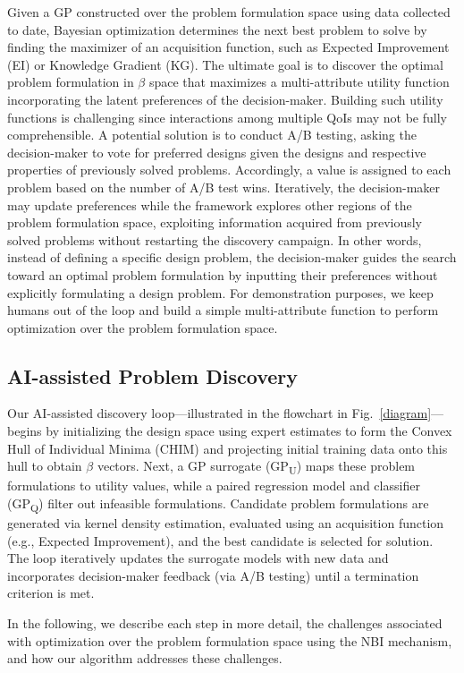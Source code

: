 \documentclass[final,5p,times,twocolumn]{elsarticle}
\begin{document}
Given a GP constructed over the problem formulation space using data collected to date, Bayesian optimization determines the next best problem to solve by finding the maximizer of an acquisition function, such as Expected Improvement (EI) or Knowledge Gradient (KG). The ultimate goal is to discover the optimal problem formulation in $\beta$ space that maximizes a multi-attribute utility function incorporating the latent preferences of the decision-maker. Building such utility functions is challenging since interactions among multiple QoIs may not be fully comprehensible. A potential solution is to conduct A/B testing, asking the decision-maker to vote for preferred designs given the designs and respective properties of previously solved problems. Accordingly, a value is assigned to each problem based on the number of A/B test wins. Iteratively, the decision-maker may update preferences while the framework explores other regions of the problem formulation space, exploiting information acquired from previously solved problems without restarting the discovery campaign. In other words, instead of defining a specific design problem, the decision-maker guides the search toward an optimal problem formulation by inputting their preferences without explicitly formulating a design problem. For demonstration purposes, we keep humans out of the loop and build a simple multi-attribute function to perform optimization over the problem formulation space.

\subsection{AI-assisted Problem Discovery}
Our AI-assisted discovery loop---illustrated in the flowchart in Fig.~\ref{diagram}---begins by initializing the design space using expert estimates to form the Convex Hull of Individual Minima (CHIM) and projecting initial training data onto this hull to obtain $\beta$ vectors. Next, a GP surrogate (GP\textsubscript{U}) maps these problem formulations to utility values, while a paired regression model and classifier (GP\textsubscript{Q}) filter out infeasible formulations. Candidate problem formulations are generated via kernel density estimation, evaluated using an acquisition function (e.g., Expected Improvement), and the best candidate is selected for solution. The loop iteratively updates the surrogate models with new data and incorporates decision-maker feedback (via A/B testing) until a termination criterion is met.

In the following, we describe each step in more detail, the challenges associated with optimization over the problem formulation space using the NBI mechanism, and how our algorithm addresses these challenges.
\end{document}
